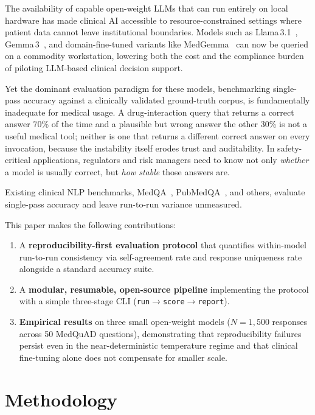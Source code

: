 \documentclass[11pt,twocolumn]{article}
\begin{document}
The availability of capable open-weight LLMs that can run entirely
on local hardware has made clinical AI accessible to resource-constrained
settings where patient data cannot leave institutional boundaries.
Models such as Llama\,3.1~\cite{dubey2024llama3},
Gemma\,3~\cite{team2024gemma}, and domain-fine-tuned variants like
MedGemma~\cite{medgemma2024} can now be queried on a commodity
workstation, lowering both the cost and the compliance burden of
piloting LLM-based clinical decision support.

Yet the dominant evaluation paradigm for these models, benchmarking
single-pass accuracy against a clinically validated ground-truth corpus, 
is fundamentally inadequate for medical usage.
A drug-interaction query that returns a correct answer 70\% of the time
and a plausible but wrong answer the other 30\% is not a useful medical
tool; neither is one that returns a different correct answer on every
invocation, because the instability itself erodes trust and
auditability.
In safety-critical applications, regulators and risk managers need to
know not only \emph{whether} a model is usually correct, but
\emph{how stable} those answers are.

Existing clinical NLP benchmarks, MedQA~\cite{jin2021disease},
PubMedQA~\cite{jin2019pubmedqa}, and others, evaluate single-pass
accuracy and leave run-to-run variance unmeasured.

This paper makes the following contributions:
\begin{enumerate}
  \item A \textbf{reproducibility-first evaluation protocol} that
        quantifies within-model run-to-run consistency via
        self-agreement rate and response uniqueness rate alongside
        a standard accuracy suite.
  \item A \textbf{modular, resumable, open-source pipeline} implementing
        the protocol with a simple three-stage CLI
        (\texttt{run\;$\to$\;score\;$\to$\;report}).
  \item \textbf{Empirical results} on three small open-weight models
        ($N{=}1{,}500$ responses across 50 MedQuAD questions),
        demonstrating that reproducibility failures persist even in
        the near-deterministic temperature regime and that clinical
        fine-tuning alone does not compensate for smaller scale.
\end{enumerate}

\section{Methodology}
\end{document}
